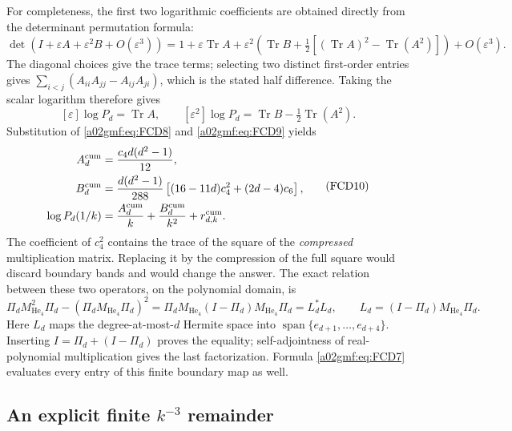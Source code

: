 For completeness, the first two logarithmic coefficients are obtained
directly from the determinant permutation formula:
\[
 \det(I+\varepsilon A+\varepsilon^2B+O(\varepsilon^3))
 =1+\varepsilon\operatorname{Tr}A+
 \varepsilon^2\left(\operatorname{Tr}B+
    \tfrac12[(\operatorname{Tr}A)^2-\operatorname{Tr}(A^2)]\right)
 +O(\varepsilon^3).
\]
The diagonal choices give the trace terms; selecting two distinct
first-order entries gives
\(\sum_{i<j}(A_{ii}A_{jj}-A_{ij}A_{ji})\), which is the stated half
difference. Taking the scalar logarithm therefore gives
\[
 [\varepsilon]\log P_d=\operatorname{Tr}A,\qquad
 [\varepsilon^2]\log P_d=\operatorname{Tr}B-\tfrac12\operatorname{Tr}(A^2).
\]
Substitution of \eqref{a02gmf:eq:FCD8} and \eqref{a02gmf:eq:FCD9} yields
\begin{equation}
 \begin{split}
 A_d^{\rm cum}&=\frac{c_4d(d^2-1)}{12},\\
 B_d^{\rm cum}
   &=\frac{d(d^2-1)}{288}
                \left[(16-11d)c_4^2+(2d-4)c_6\right],\\
 \log P_d(1/k)&=\frac{A_d^{\rm cum}}k
                         +\frac{B_d^{\rm cum}}{k^2}
                         +r_{d,k}^{\rm cum}.
 \end{split}
 \tag{FCD10}\label{a02gmf:eq:FCD10}
\end{equation}
The coefficient of \(c_4^2\) contains the trace of the
square of the \emph{compressed} multiplication matrix. Replacing it
by the compression of the full square would discard boundary bands and
would change the answer.
The exact relation between these two operators, on the polynomial domain,
is
\[
 \Pi_d M_{\operatorname{He}_4}^2\Pi_d
       -(\Pi_dM_{\operatorname{He}_4}\Pi_d)^2
   =\Pi_dM_{\operatorname{He}_4}(I-\Pi_d)
                             M_{\operatorname{He}_4}\Pi_d
   =L_d^*L_d,\qquad
 L_d=(I-\Pi_d)M_{\operatorname{He}_4}\Pi_d .
\]
Here \(L_d\) maps the degree-at-most-\(d\) Hermite space into
\(\operatorname{span}\{e_{d+1},\ldots,e_{d+4}\}\).
Inserting \(I=\Pi_d+(I-\Pi_d)\) proves the equality;
self-adjointness of real-polynomial multiplication gives the last
factorization. Formula \eqref{a02gmf:eq:FCD7} evaluates every entry of
this finite boundary map as well.

\subsection{An explicit finite \(k^{-3}\) remainder}

